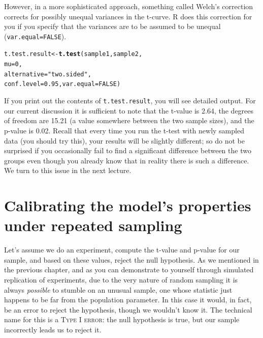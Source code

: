 \documentclass[12pt]{book}\usepackage[]{graphicx}\usepackage[]{color}
\makeatletter
\newcommand{\hlnum}[1]{\textcolor[rgb]{0.686,0.059,0.569}{#1}}%
\newcommand{\hlstr}[1]{\textcolor[rgb]{0.192,0.494,0.8}{#1}}%
\newcommand{\hlstd}[1]{\textcolor[rgb]{0.345,0.345,0.345}{#1}}%
\newcommand{\hlkwb}[1]{\textcolor[rgb]{0.69,0.353,0.396}{#1}}%
\newcommand{\hlkwc}[1]{\textcolor[rgb]{0.333,0.667,0.333}{#1}}%
\newcommand{\hlkwd}[1]{\textcolor[rgb]{0.737,0.353,0.396}{\textbf{#1}}}%
\newenvironment{kframe}{%
 \def\at@end@of@kframe{}%
 \ifinner\ifhmode%
  \def\at@end@of@kframe{\end{minipage}}%
  \begin{minipage}{\columnwidth}%
 \fi\fi%
 \def\FrameCommand##1{\hskip\@totalleftmargin \hskip-\fboxsep
 \colorbox{shadecolor}{##1}\hskip-\fboxsep
     \hskip-\linewidth \hskip-\@totalleftmargin \hskip\columnwidth}%
 \MakeFramed {\advance\hsize-\width
   \@totalleftmargin\z@ \linewidth\hsize
   \@setminipage}}%
 {\par\unskip\endMakeFramed%
 \at@end@of@kframe}
\newenvironment{knitrout}{}{} %
\makeatother
\begin{document}
However, in a more sophisticated approach, something called Welch's
correction corrects for possibly unequal variances
in the t-curve. R does this correction for you if you specify that
the variances are to be assumed to be unequal (\texttt{var.equal=FALSE}).

\begin{knitrout}
\color{fgcolor}\begin{kframe}
\begin{alltt}
\hlstd{t.test.result}\hlkwb{<-}\hlkwd{t.test}\hlstd{(sample1,sample2,}
       \hlkwc{mu}\hlstd{=}\hlnum{0}\hlstd{,}
       \hlkwc{alternative} \hlstd{=} \hlstr{"two.sided"}\hlstd{,}
        \hlkwc{conf.level} \hlstd{=} \hlnum{0.95}\hlstd{,}\hlkwc{var.equal}\hlstd{=}\hlnum{FALSE}\hlstd{)}
\end{alltt}
\end{kframe}
\end{knitrout}

If you print out the contents of \texttt{t.test.result}, you will see
detailed output. For our current discussion it is sufficient to note
that the t-value is 2.64,
the degrees of freedom are  
15.21 (a value somewhere
between the two sample sizes), 
and the p-value is 0.02. Recall that every
time you run the t-test with newly sampled data (you should try this), your results will be
slightly different; so do not be surprised if you occasionally fail to
find a significant difference between the two groups even though you
already know that in reality there is such a difference. We turn to this
issue in the next lecture.





\chapter{Calibrating the model's properties under repeated sampling}

Let's assume we do an experiment, compute the t-value and p-value for
our sample, and based on these values, reject the null hypothesis. As
we mentioned in the previous chapter, and as you can demonstrate to yourself
through simulated replication of experiments, due to the very nature
of random sampling it is always \emph{possible} to stumble on an unusual sample, one whose statistic just happens to be far from the population parameter. In this case it would, in fact, be an error to reject the hypothesis, though we wouldn't know it. The technical name for this is a \textsc{Type I error}: the null hypothesis is true, but our sample incorrectly leads us to reject it.
\end{document}

